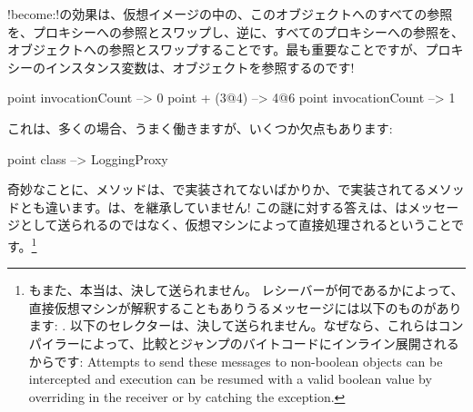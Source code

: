 \documentclass[a4paper,10pt,twoside]{book}
\begin{document}
\ct!become:!の効果は、仮想イメージの中の、このオブジェクトへのすべての参照を、プロキシーへの参照とスワップし、逆に、すべてのプロキシーへの参照を、オブジェクトへの参照とスワップすることです。最も重要なことですが、プロキシーのインスタンス変数は、オブジェクトを参照するのです!

\begin{code}{}
point invocationCount --> 0
point + (3@4)             --> 4@6
point invocationCount --> 1
\end{code}

これは、多くの場合、うまく働きますが、いくつか欠点もあります:
\begin{code}{}
point class --> LoggingProxy
\end{code}
奇妙なことに、メソッドは、で実装されてないばかりか、で実装されてるメソッドとも違います。は、を継承していません!
この謎に対する答えは、はメッセージとして送られるのではなく、仮想マシンによって直接処理されるということです。\footnote{もまた、本当は、決して送られません。
レシーバーが何であるかによって、直接仮想マシンが解釈することもありうるメッセージには以下のものがあります:
\ct{+- < > <= >= = ~= * / \ ==}
.
以下のセレクターは、決して送られません。なぜなら、これらはコンパイラーによって、比較とジャンプのバイトコードにインライン展開されるからです:
Attempts to send these messages to non-boolean objects can be intercepted and execution can be resumed with a valid boolean value by overriding  in the receiver or by catching the  exception.
}%
\end{document}
